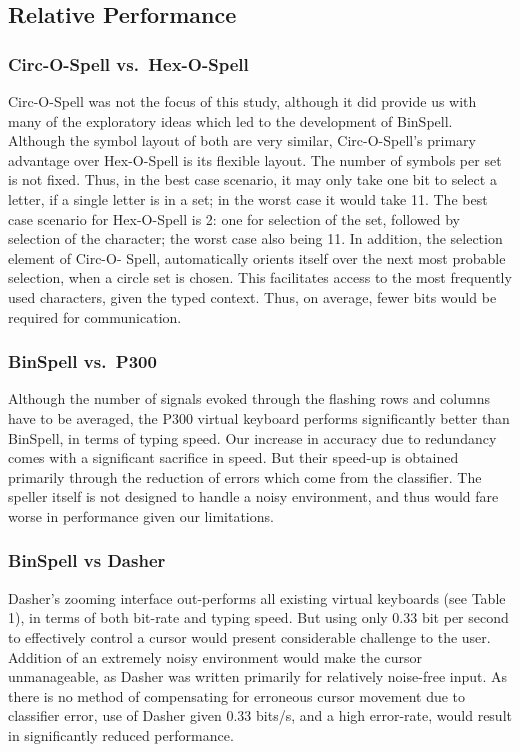 \documentclass[12pt,titlepage]{article}
\begin{document}
\subsection{Relative Performance}

\subsubsection{Circ-O-Spell vs.\ Hex-O-Spell}

Circ-O-Spell was not the focus of this study, although it did provide us with many of the exploratory ideas which led to the development of BinSpell.  Although the symbol layout of both are very similar, Circ-O-Spell's primary advantage over Hex-O-Spell is its flexible layout.  The number of 
symbols per set is not fixed.  Thus, in the best case scenario, it may only take one bit to select a 
letter, if a single letter is in a set; in the worst case it would take 11.  The best case scenario for Hex-O-Spell is 2: one for selection 
of the set, followed by selection of the character; the worst case also being 11.  In addition, the selection element of Circ-O- 
Spell, automatically orients itself over the next most probable selection, when a circle set is chosen.  This facilitates access to the most frequently used 
characters, given the typed context.  Thus, on average, fewer bits would be required for 
communication.

\subsubsection{BinSpell vs.\ P300}

Although the number of signals evoked through the flashing rows and columns have to be averaged, the P300 virtual keyboard performs significantly better than BinSpell, in terms of typing speed.  Our increase in accuracy due to redundancy comes with a significant sacrifice in speed.  But their speed-up is obtained primarily through the reduction of errors which come from the classifier.  The speller itself is not designed to handle a noisy environment, and thus would fare worse in performance given our limitations.

\subsubsection{BinSpell vs Dasher}

Dasher's zooming interface out-performs all existing virtual keyboards (see Table 1), in terms of both bit-rate and typing speed.  But using only 0.33 bit per second to effectively control a cursor would present considerable challenge to the user.  Addition of an extremely 
noisy environment would make the cursor unmanageable, as Dasher was written primarily for relatively noise-free input. As there is no method of compensating for erroneous cursor movement due to classifier error, use of Dasher given $0.33$ bits/s, and a high error-rate, would result in significantly reduced performance.
\end{document}
